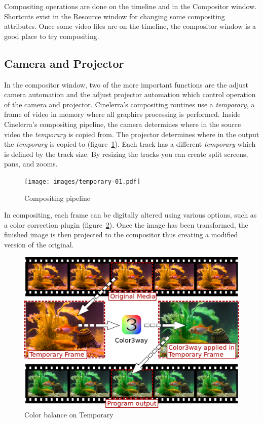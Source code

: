 Compositing operations are done on the timeline and in the Compositor window. Shortcuts exist in the Resource window for changing some compositing attributes. 
Once some video files are on the timeline, the compositor window is a good place to try compositing.

\subsection{Camera and Projector}%
\label{sub:camera_and_projector}

In the compositor window, two of the more important functions are the adjust camera automation and the adjust projector automation which control operation of the camera and projector. 
Cinelerra's compositing routines use a \textit{temporary}, a frame of video in memory where all graphics processing is performed. 
Inside Cinelerra's compositing pipeline, the camera determines where in the source video the \textit{temporary} is copied from. 
The projector determines where in the output the \textit{temporary} is copied to (figure~\ref{fig:temporary-01}). 
Each track has a different \textit{temporary} which is defined by the track size. By resizing the tracks you can create split screens, pans, and zooms.

\begin{figure}[htpb]
    \centering
    \texttt{[image: images/temporary-01.pdf]}
    \caption{Compositing pipeline}
    \label{fig:temporary-01}
\end{figure}

In compositing, each frame can be digitally altered using various options, such as a color correction plugin (figure~\ref{fig:camera_and_projector}). 
Once the image has been transformed, the finished image is then projected to the compositor thus creating a modified version of the original.

\begin{figure}[htpb]
    \centering
    \includegraphics[width=0.8\linewidth]{images/camera_and_projector.png}
    \caption{Color balance on Temporary}
    \label{fig:camera_and_projector}
\end{figure}

